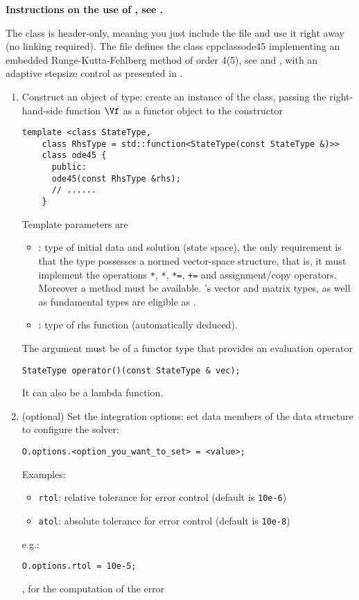 \textbf{Instructions on the use of , see .}

The class  is header-only, meaning you just include the file and use it
right away (no linking required). The file  defines the class
cppclass{ode45} implementing an embedded Runge-Kutta-Fehlberg method of order 4(5), see
 and , with an adaptive stepsize control as presented in
. 

\begin{enumerate}
\item Construct an object of  type:
  create an instance of the class, passing the right-hand-side function $\Vf$ as a
  functor object to the constructor
  \begin{lstlisting}[style=cppsimple,emph={ode45},emph={[2]StateType,RhsType}]
    template <class StateType,
    class RhsType = std::function<StateType(const StateType &)>>
    class ode45 {
      public:
      ode45(const RhsType &rhs);
      // ......
    }
  \end{lstlisting}

  Template parameters are
  \begin{itemize}
  \item {}: type of initial data and solution (state space), the only requirement
    is that the type possesses a normed vector-space structure, that is, it must
    implement the operations \verb|*|, \verb|*|, \verb|*=|, \verb|+=| and
    assignment/copy operators. Moreover a  method must be available.
    \eigen's vector and matrix types, as well as fundamental types are eligible as
    .
  \item {}:    type of rhs function (automatically deduced).
  \end{itemize}
  The argument  must be of a functor type that provides an evaluation operator
  \begin{lstlisting}[style=cppsimple,emph={[2]StateType}]
    StateType operator()(const StateType & vec);
  \end{lstlisting}
  It can also be a lambda function. 
\item (optional) Set the integration options: set data members of the data structure
   to configure the solver:
  \begin{lstlisting}[style=cppsimple]
    O.options.<option_you_want_to_set> = <value>;
  \end{lstlisting}
  Examples:
  \begin{itemize}
  \item \texttt{rtol}:       relative tolerance for error control (default is \texttt{10e-6})
  \item \texttt{atol}:       absolute tolerance for error control (default is \texttt{10e-8})
  \end{itemize}
  e.g.:
  \begin{lstlisting}[style=cppsimple]
    O.options.rtol = 10e-5;
  \end{lstlisting}, for the computation of the error


\end{enumerate}
